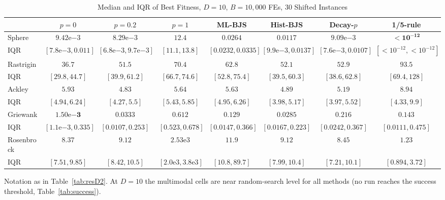 \documentclass[conference]{IEEEtran}
\begin{document}
\begin{table}[t]
\centering
\caption{Median and IQR of Best Fitness, $D=10$, $B=10{,}000$ FEs, 30 Shifted Instances}
\label{tab:resD10}
\scriptsize
\setlength{\tabcolsep}{1.5pt}
\begin{tabular}{@{}lccccccc@{}}
\toprule
 & $p{=}0$ & $p{=}0.2$ & $p{=}1$ & ML-BJS & Hist-BJS & Decay-$p$ & 1/5-rule\\
\midrule
Sphere & $9.42\mathrm{e}{-3}$ & $8.29\mathrm{e}{-3}$ & $12.4$ & $0.0264$ & $0.0117$ & $9.09\mathrm{e}{-3}$ & $\mathbf{<\!10^{-12}}$ \\
\hspace{1em}IQR & $[7.8\mathrm{e}{-3},0.011]$ & $[6.8\mathrm{e}{-3},9.7\mathrm{e}{-3}]$ & $[11.1,13.8]$ & $[0.0232,0.0335]$ & $[9.9\mathrm{e}{-3},0.0137]$ & $[7.6\mathrm{e}{-3},0.0107]$ & $[<\!10^{-12},<\!10^{-12}]$ \\
Rastrigin & $\mathbf{36.7}$ & $51.5$ & $70.4$ & $62.8$ & $52.1$ & $52.9$ & $93.5$ \\
\hspace{1em}IQR & $[29.8,44.7]$ & $[39.9,61.2]$ & $[66.7,74.6]$ & $[52.8,75.4]$ & $[39.5,60.3]$ & $[38.6,62.8]$ & $[69.4,128]$ \\
Ackley & $5.93$ & $\mathbf{4.83}$ & $5.64$ & $5.63$ & $4.89$ & $5.19$ & $8.94$ \\
\hspace{1em}IQR & $[4.94,6.24]$ & $[4.27,5.5]$ & $[5.43,5.85]$ & $[4.95,6.26]$ & $[3.98,5.17]$ & $[3.97,5.52]$ & $[4.33,9.9]$ \\
Griewank & $\mathbf{1.50\mathrm{e}{-3}}$ & $0.0333$ & $0.612$ & $0.129$ & $0.0285$ & $0.216$ & $0.143$ \\
\hspace{1em}IQR & $[1.1\mathrm{e}{-3},0.335]$ & $[0.0107,0.253]$ & $[0.523,0.678]$ & $[0.0147,0.366]$ & $[0.0167,0.223]$ & $[0.0242,0.367]$ & $[0.0111,0.475]$ \\
Rosenbrock & $8.37$ & $9.12$ & $2.53\mathrm{e}{3}$ & $11.9$ & $9.12$ & $8.45$ & $\mathbf{1.23}$ \\
\hspace{1em}IQR & $[7.51,9.85]$ & $[8.42,10.5]$ & $[2.0\mathrm{e}{3},3.8\mathrm{e}{3}]$ & $[10.8,89.7]$ & $[7.99,10.4]$ & $[7.21,10.1]$ & $[0.894,3.72]$ \\
\bottomrule
\end{tabular}

\smallskip
\footnotesize Notation as in Table~\ref{tab:resD2}. At $D=10$ the multimodal cells are near random-search level for all methods (no run reaches the success threshold, Table~\ref{tab:success}).
\end{table}
\end{document}
